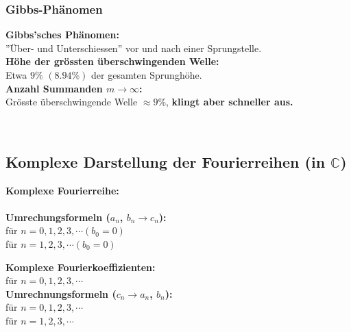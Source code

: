 			\subsubsection{Gibbs-Phänomen}
				\begin{minipage}[b]{0.65\textwidth}
					\textbf{Gibbs'sches Phänomen:}\\[3pt]
					''Über- und Unterschiessen'' vor und nach einer Sprungstelle.\\[3pt]
					\textbf{Höhe der grössten überschwingenden Welle:}\\[3pt]
					Etwa $9\%$ $(8.94\%)$ der gesamten Sprunghöhe.\\[3pt]
					\textbf{Anzahl Summanden $m \rightarrow \infty$:}\\[3pt]
					Grösste überschwingende Welle $\approx 9\%$, \textbf{klingt aber schneller aus.}
				\end{minipage}
				\begin{minipage}[]{0.35\textwidth}
					\scalebox{0.8}{}\\[3pt]
				\end{minipage}
		
		\subsection{Komplexe Darstellung der Fourierreihen (in $\mathbb{C}$)}
			\begin{minipage}[t]{0.5\textwidth}
				\textbf{Komplexe Fourierreihe:}\\[3pt]
				\\[3pt]
				\textbf{Umrechungsformeln ($a_n$, $b_n \rightarrow c_n$):}\\[3pt]
				 für $n = 0, 1, 2, 3, \cdots (b_0 = 0)$\\[3pt]
				 für $n = 1, 2, 3, \cdots (b_0 = 0)$\\[3pt]
			\end{minipage}
			\begin{minipage}[t]{0.5\textwidth}
				\textbf{Komplexe Fourierkoeffizienten:}\\[3pt]
				 für $n = 0, 1, 2, 3, \cdots$\\[3pt]
				\textbf{Umrechnungsformeln ($c_n \rightarrow a_n$, $b_n$):}\\[3pt]
				 für $n = 0, 1, 2, 3, \cdots$\\[3pt]
				 für $n = 1, 2, 3, \cdots$\\[3pt]
			\end{minipage}
		
